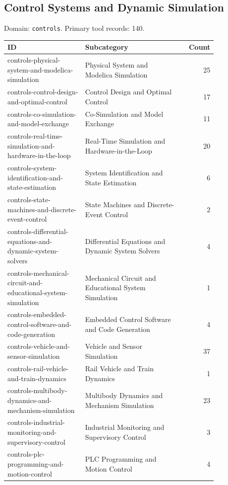 \subsection{Control Systems and Dynamic Simulation}
\noindent Domain: \texttt{controls}. Primary tool records: 140.
\begin{longtable}{p{0.37\linewidth}p{0.47\linewidth}r}
ID & Subcategory & Count\\\hline\endhead
controls-physical-system-and-modelica-simulation & Physical System and Modelica Simulation & 25\\
controls-control-design-and-optimal-control & Control Design and Optimal Control & 17\\
controls-co-simulation-and-model-exchange & Co-Simulation and Model Exchange & 11\\
controls-real-time-simulation-and-hardware-in-the-loop & Real-Time Simulation and Hardware-in-the-Loop & 20\\
controls-system-identification-and-state-estimation & System Identification and State Estimation & 6\\
controls-state-machines-and-discrete-event-control & State Machines and Discrete-Event Control & 2\\
controls-differential-equations-and-dynamic-system-solvers & Differential Equations and Dynamic System Solvers & 4\\
controls-mechanical-circuit-and-educational-system-simulation & Mechanical Circuit and Educational System Simulation & 1\\
controls-embedded-control-software-and-code-generation & Embedded Control Software and Code Generation & 4\\
controls-vehicle-and-sensor-simulation & Vehicle and Sensor Simulation & 37\\
controls-rail-vehicle-and-train-dynamics & Rail Vehicle and Train Dynamics & 1\\
controls-multibody-dynamics-and-mechanism-simulation & Multibody Dynamics and Mechanism Simulation & 23\\
controls-industrial-monitoring-and-supervisory-control & Industrial Monitoring and Supervisory Control & 3\\
controls-plc-programming-and-motion-control & PLC Programming and Motion Control & 4\\
\end{longtable}

